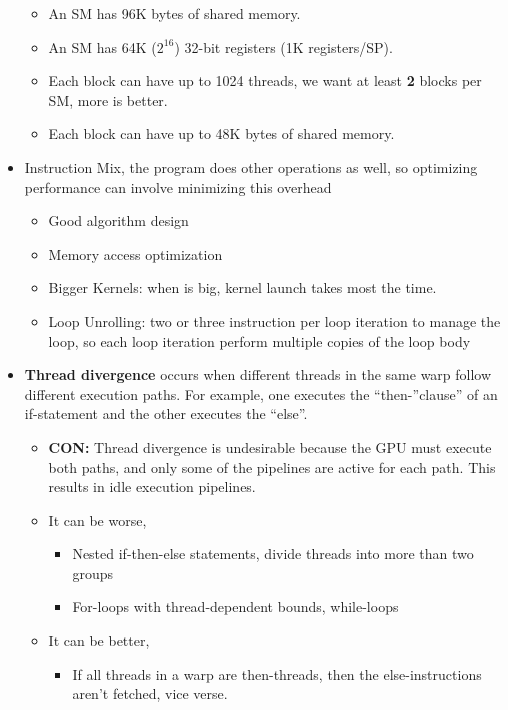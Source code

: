 \documentclass[../main.tex]{subfiles}
\begin{document}
\begin{itemize}
\begin{itemize}
		      \item An SM has 96K bytes of shared memory.
		      \item An SM has 64K (\(2^{16}\)) 32-bit registers (1K registers/SP).
		      \item Each block can have up to 1024 threads, we want at least \textbf{2} blocks per SM, more is better.
		      \item Each block can have up to 48K bytes of shared memory.
	      \end{itemize}
	\item Instruction Mix, the program does other operations as well, so optimizing performance can involve minimizing this overhead
	      \begin{itemize}
		      \item Good algorithm design
		      \item Memory access optimization
		      \item Bigger Kernels: when  is big, kernel launch takes most the time.
		      \item Loop Unrolling: two or three instruction per loop iteration to manage the loop, so each loop iteration perform multiple copies of the loop body
	      \end{itemize}
	\item \textbf{Thread divergence} occurs when different threads in the same warp follow different execution paths. For example, one executes the “then-”clause” of an if-statement and the other executes the “else”.
	      \begin{itemize}
		      \item \textbf{CON:} Thread divergence is undesirable because the GPU must execute both paths, and only some of the pipelines are active for each path. This results in idle execution pipelines.
		      \item It can be worse,
		            \begin{itemize}
			            \item Nested if-then-else statements, divide threads into more than two groups
			            \item For-loops with thread-dependent bounds, while-loops
		            \end{itemize}
		      \item It can be better,
		            \begin{itemize}
			            \item If all threads in a warp are then-threads, then the else-instructions aren't fetched, vice verse.

\end{itemize}
\end{itemize}
\end{itemize}
\end{document}
